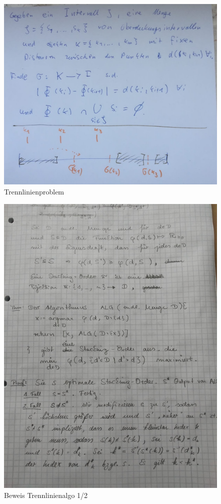 \documentclass[a4paper,11pt]{article}
\theoremstyle{mytheor}
\begin{document}
\begin{figure}[htp]
\includegraphics[width=\textwidth,height=\textheight,keepaspectratio]{assets/trennlinienproblem.jpg}
\caption{Trennlinienproblem}
\end{figure}

\begin{figure}[htp]
\includegraphics[width=\textwidth,height=\textheight,keepaspectratio]{assets/david_proof1.jpg}
\caption{Beweis Trennlinienalgo 1/2}
\end{figure}
\end{document}
